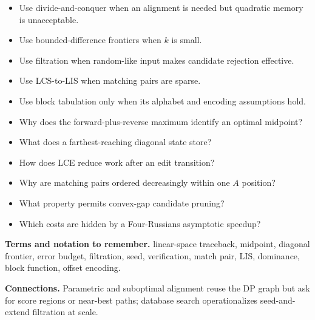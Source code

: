 \documentclass[11pt]{article}
\begin{document}
\begin{tcolorbox}[enhanced,breakable,title={Algorithm selection / when to use this},
  colback=Primary!3,colframe=Primary,fonttitle=\small\sffamily\bfseries,fontupper=\footnotesize,
  boxsep=0.6mm,left=1.5mm,right=1.5mm,top=1mm,bottom=1mm,before skip=3pt,after skip=3pt]
\begin{itemize}
  \item Use divide-and-conquer when an alignment is needed but quadratic memory is unacceptable.
  \item Use bounded-difference frontiers when $k$ is small.
  \item Use filtration when random-like input makes candidate rejection effective.
  \item Use LCS-to-LIS when matching pairs are sparse.
  \item Use block tabulation only when its alphabet and encoding assumptions hold.
\end{itemize}
\end{tcolorbox}

\begin{tcolorbox}[enhanced,breakable,title={Self-test questions},
  colback=white,colframe=Accent,fonttitle=\small\sffamily\bfseries,fontupper=\footnotesize,
  boxsep=0.6mm,left=1.5mm,right=1.5mm,top=1mm,bottom=1mm,before skip=3pt,after skip=3pt]
\begin{itemize}
  \item Why does the forward-plus-reverse maximum identify an optimal midpoint?
  \item What does a farthest-reaching diagonal state store?
  \item How does LCE reduce work after an edit transition?
  \item Why are matching pairs ordered decreasingly within one $A$ position?
  \item What property permits convex-gap candidate pruning?
  \item Which costs are hidden by a Four-Russians asymptotic speedup?
\end{itemize}
\end{tcolorbox}

{\footnotesize
\textbf{Terms and notation to remember.} linear-space traceback, midpoint, diagonal frontier, error budget, filtration, seed, verification, match pair, LIS, dominance, block function, offset encoding.

\textbf{Connections.} Parametric and suboptimal alignment reuse the DP graph but ask for score regions or near-best paths; database search operationalizes seed-and-extend filtration at scale.
}
\end{document}
